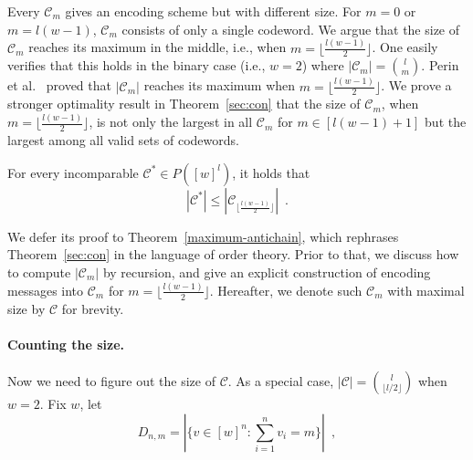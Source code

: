 Every $\mathcal{C}_m$ gives an encoding scheme but with different size. For $m=0$ or $m=l(w-1)$, $\mathcal{C}_m$
consists of only a single codeword. We argue that the size of $\mathcal{C}_m$
reaches its maximum in the middle, i.e., when
$m=\lfloor\frac{l(w-1)}{2}\rfloor$. One easily verifies that this holds in the
binary case (i.e., $w=2$) where $|\mathcal{C}_m|=\binom{l}{m}$. Perin et
al.~\cite{perin2021improved} proved that $|\mathcal{C}_{m}|$ reaches its maximum
when $m=\lfloor\frac{l(w-1)}{2}\rfloor$. We prove a stronger optimality result in Theorem~\ref{sec:con} that the size of $\mathcal{C}_{m}$, when $m=\lfloor\frac{l(w-1)}{2}\rfloor$, is not only the largest in all $\mathcal{C}_m$ for $m\in[l(w-1)+1]$ but the largest among all valid sets of codewords.

\begin{theorem}\label{sec:con}
For every incomparable $\mathcal{C^*}\in P([w]^l)$, it holds that 
\[
 |\mathcal{C^*}| \leq |\mathcal{C}_{\lfloor\frac{l(w-1)}{2}\rfloor}|\enspace.
\]
\end{theorem}
We defer its proof to Theorem~\ref{maximum-antichain}, which rephrases
Theorem~\ref{sec:con}  in the language of order theory. Prior to that, we discuss how to compute  $|\mathcal{C}_m|$ by recursion, and give an explicit construction of 
encoding messages into $\mathcal{C}_{m}$ for $m=\lfloor\frac{l(w-1)}{2}\rfloor$. Hereafter, we denote such $\mathcal{C}_{m}$ with maximal size by $\mathcal{C}$ for brevity. 






\paragraph{Counting the size.} Now we need to figure out the size of $\mathcal{C}$. As a special case, $|\mathcal{C}|=\binom{l}{\lfloor l/2 \rfloor}$ when $w=2$. Fix $w$, let
$$ D_{n,m}= |\{v\in [w]^n : \sum_{i=1}^{n} v_i = m \}| \enspace , $$

